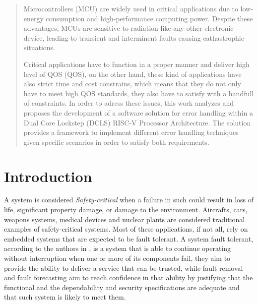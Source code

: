 \documentclass[10pt, a4paper]{report}
\begin{document}
\newpage

\begin{abstract}
    \thispagestyle{fancy}
    Microcontrollers (\acrshort{MCU}) are widely used in critical applications 
    due to low-energy consumption and high-performance computing power. Despite 
    these advantages, \acrshort{MCU}s are sensitive to radiation like any other
    electronic device, leading to transient and interminent faults causing
    cathastrophic situations.

    Critical applications have to function in a proper manner and deliver high
    level of \acrlong{QOS} (\acrshort{QOS}), on the other hand, these kind of
    applications have also strict time and cost constrains, which means that
    they do not only have to meet high \acrshort{QOS} standards, they also have
    to satisfy with a handfull of constraints. In order to adress these issues, 
    this work analyzes and proposes the development of a software solution for 
    error handling within a Dual Core Lockstep (\acrshort{DCLS}) RISC-V 
    Processor Architecture. The solution provides a framework to implement 
    different error handling techniques given specific scenarios in order to 
    satisfy both requirements.
\end{abstract}

\newpage
\begin{tableofcontents}
    \thispagestyle{fancy}
\end{tableofcontents}

\newpage

\chapter{Introduction}

\thispagestyle{fancy}
A system is considered \emph{Safety-critical} when a failure in such could
result in loss of life, significant property damage, or damage to the
environment. Aircrafts, cars, weapons systems, medical devices and nuclear 
plants are considered traditional examples of safety-critical systems. Most of 
these applications, if not all, rely on embedded systems that are expected to be 
fault tolerant. A system fault tolerant, according to the authors in 
\cite{nasa_fault_tolerance}, is a system that is able to continue operating 
without interruption when one or more of its components fail, they aim 
to provide the ability to deliver a service that can be trusted, while fault 
removal and fault forecasting aim to reach confidence in that ability by 
justifying that the functional and the dependability and security specifications 
are adequate and that such system is likely to meet them.
\end{document}
